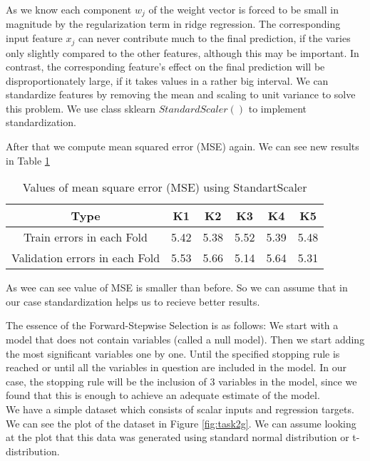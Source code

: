 \documentclass[a4paper, twoside, english]{article}
\begin{document}
  
As we know each component $w_j$ of the weight vector is forced to be small in magnitude by the regularization term in ridge regression. The corresponding input feature $x_j$ can never contribute much to the final prediction, if the varies only slightly compared to the other features, although this may be important. In contrast, the corresponding feature's effect on the final prediction will be disproportionately large, if it takes values in a rather big interval. We can standardize features by removing the mean and scaling to unit variance to solve this problem. We use class sklearn $StandardScaler()$ to implement standardization. \\
\newpage

After that we compute mean squared error (MSE) again. We can see new results in Table \ref{table:2}
\begin{center}
	\begin{table}[h!]
		\centering
		\begin{tabular}{||c c c c c c||} 
			\hline
			Type & K1 & K2 & K3 & K4 & K5 \\ [0.5ex] 
			\hline\hline
			Train errors in each Fold & 5.42 & 5.38 & 5.52 & 5.39 & 5.48 \\ 
			\hline
			Validation errors in each Fold & 5.53 & 5.66 & 5.14 & 5.64 & 5.31 \\ [1ex] 
			\hline
		\end{tabular}
		\caption{Values of mean square error (MSE) using StandartScaler}
		\label{table:2}
	\end{table}
\end{center}

As wee can see value of MSE is smaller than before. So we can assume that in our case standardization helps us to recieve better results.

The essence of the Forward-Stepwise Selection is as follows: We start with a model that does not contain variables (called a null model).
Then we start adding the most significant variables one by one. Until the specified stopping rule is reached or until all the variables in question are included in the model. In our case, the stopping rule will be the inclusion of 3 variables in the model, since we found that this is enough to achieve an adequate estimate of the model.\\
 
We have a simple dataset which consists of scalar inputs and regression targets. We can see the plot of the dataset in Figure \ref{fig:task2g}. We can assume looking at the plot that this data was generated using standard normal distribution or t-distribution.
\end{document}
